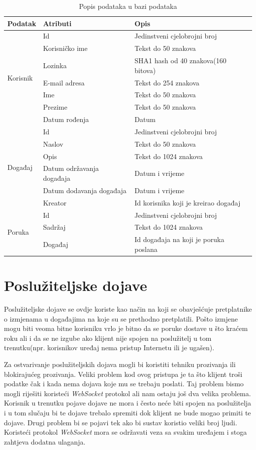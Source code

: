\documentclass[times, utf8, zavrsni]{fer}
\begin{document}
{\begin{table}[htb]
\caption{Popis podataka u bazi podataka}
\label{tbl:database}
\centering
\begin{tabular}{lll} \hline
Podatak & Atributi & Opis\\ \hline
\multirow{7}{*}{Korisnik}
& Id & Jedinstveni cjelobrojni broj \\
& Korisničko ime & Tekst do 50 znakova \\
& Lozinka & SHA1 hash od 40 znakova(160 bitova) \\
& E-mail adresa & Tekst do 254 znakova \\
& Ime & Tekst do 50 znakova \\
& Prezime & Tekst do 50 znakova \\
& Datum rođenja & Datum \\ \hline
\multirow{6}{*}{Događaj}
& Id & Jedinstveni cjelobrojni broj \\
& Naslov & Tekst do 50 znakova \\
& Opis & Tekst do 1024 znakova \\
& Datum održavanja događaja & Datum i vrijeme \\
& Datum dodavanja događaja & Datum i vrijeme \\ 
& Kreator & Id korisnika koji je kreirao događaj \\ \hline
\multirow{3}{*}{Poruka}
& Id & Jedinstveni cjelobrojni broj \\
& Sadržaj & Tekst do 1024 znakova \\
& Događaj & Id događaja na koji je poruka poslana \\ \hline
\end{tabular}
\end{table}

\section{Poslužiteljske dojave}
Poslužiteljske dojave se ovdje koriste kao način na koji se obavješćuje pretplatnike o izmjenama u događajima na koje su se prethodno pretplatili. Pošto izmjene mogu biti veoma bitne korisniku vrlo je bitno da se poruke dostave u što kraćem roku ali i da se ne izgube ako klijent nije spojen na poslužitelj u tom trenutku(npr. korisnikov uređaj nema pristup Internetu ili je ugašen).

Za ostvarivanje poslužiteljskih dojava mogli bi koristiti tehniku prozivanja ili blokirajućeg prozivanja. Veliki problem kod ovog pristupa je ta što klijent troši podatke čak i kada nema dojava koje mu se trebaju poslati. Taj problem bismo mogli riješiti koristeći {\em WebSocket} protokol ali nam ostaju još dva velika problema. Korisnik u trenutku pojave dojave ne mora i često neće biti spojen na poslužitelja i u tom slučaju bi te dojave trebalo spremiti dok klijent ne bude mogao primiti te dojave. Drugi problem bi se pojavi tek ako bi sustav koristio veliki broj ljudi. Koristeći protokol {\em WebSocket} mora se održavati veza sa svakim uređajem i stoga zahtjeva dodatna ulaganja.

}
\end{document}
